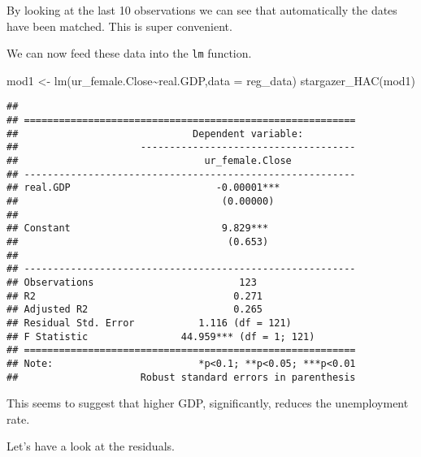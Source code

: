 \documentclass[
]{article}
\newenvironment{Shaded}{\begin{snugshade}}{\end{snugshade}}
\newcommand{\AttributeTok}[1]{\textcolor[rgb]{0.77,0.63,0.00}{#1}}
\newcommand{\DecValTok}[1]{\textcolor[rgb]{0.00,0.00,0.81}{#1}}
\newcommand{\FunctionTok}[1]{\textcolor[rgb]{0.00,0.00,0.00}{#1}}
\newcommand{\NormalTok}[1]{#1}
\newcommand{\OtherTok}[1]{\textcolor[rgb]{0.56,0.35,0.01}{#1}}
\newcommand{\SpecialCharTok}[1]{\textcolor[rgb]{0.00,0.00,0.00}{#1}}
\newcommand{\StringTok}[1]{\textcolor[rgb]{0.31,0.60,0.02}{#1}}
\begin{document}
By looking at the last 10 observations we can see that automatically the
dates have been matched. This is super convenient.

We can now feed these data into the \texttt{lm} function.

\begin{Shaded}
\begin{Highlighting}[]
\NormalTok{mod1 }\OtherTok{\textless{}{-}} \FunctionTok{lm}\NormalTok{(ur\_female.Close}\SpecialCharTok{\textasciitilde{}}\NormalTok{real.GDP,}\AttributeTok{data =}\NormalTok{ reg\_data)}
\FunctionTok{stargazer\_HAC}\NormalTok{(mod1)}
\end{Highlighting}
\end{Shaded}

\begin{verbatim}
## 
## =========================================================
##                              Dependent variable:         
##                     -------------------------------------
##                                ur_female.Close           
## ---------------------------------------------------------
## real.GDP                         -0.00001***             
##                                   (0.00000)              
##                                                          
## Constant                          9.829***               
##                                    (0.653)               
##                                                          
## ---------------------------------------------------------
## Observations                         123                 
## R2                                  0.271                
## Adjusted R2                         0.265                
## Residual Std. Error           1.116 (df = 121)           
## F Statistic                44.959*** (df = 1; 121)       
## =========================================================
## Note:                         *p<0.1; **p<0.05; ***p<0.01
##                     Robust standard errors in parenthesis
\end{verbatim}

This seems to suggest that higher GDP, significantly, reduces the
unemployment rate.

Let's have a look at the residuals.

\begin{Shaded}
\end{Shaded}
\end{document}
